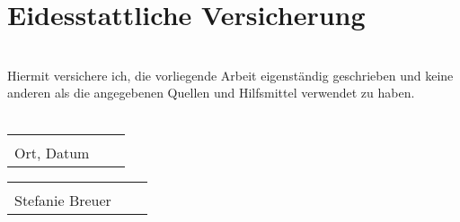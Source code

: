 %
%
%
%
%
%
%
%
%

\setcounter{page}{15}
\lhead{}
\renewcommand{\headrulewidth}{0pt}


\section*{\Huge{Eidesstattliche Versicherung}}


\ \\[1.5cm]Hiermit versichere ich, die vorliegende Arbeit eigenständig geschrieben und keine anderen als die angegebenen Quellen und Hilfsmittel verwendet zu haben. 
\\
\\[2cm]


\vspace{0.5 cm} 
\begin{tabular}{p{5cm}p{.4cm}l}
\hline \\ 
Ort, Datum
\end{tabular}
\hfill 
\begin{tabular}{p{8cm}p{.4cm}l}
\hline \\ 
Stefanie Breuer 
\end{tabular}

\restoregeometry